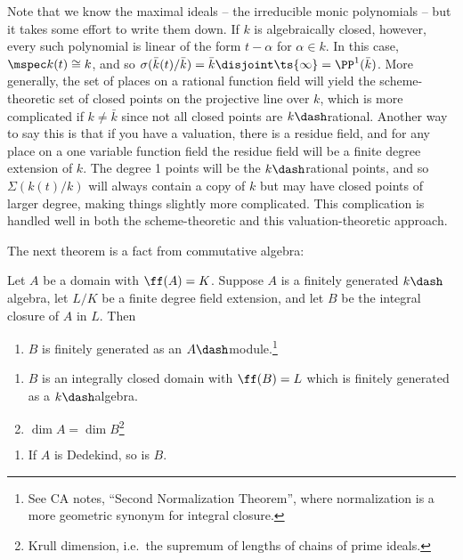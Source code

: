 Note that we know the maximal ideals -- the irreducible monic
polynomials -- but it takes some effort to write them down. If \(k\) is
algebraically closed, however, every such polynomial is linear of the
form \(t-\alpha\) for \(\alpha\in k\). In this case,
\(\mspec k(t) \cong k\), and so
\(\sigma( \bar k (t) / \bar k) = \bar k \disjoint \ts{\infty} = \PP^1(\bar k)\).
More generally, the set of places on a rational function field will
yield the scheme-theoretic set of closed points on the projective line
over \(k\), which is more complicated if \(k\neq \bar k\) since not all
closed points are \(k\dash\)rational. Another way to say this is that if
you have a valuation, there is a residue field, and for any place on a
one variable function field the residue field will be a finite degree
extension of \(k\). The degree 1 points will be the \(k\dash\)rational
points, and so \(\Sigma(k(t) / k)\) will always contain a copy of \(k\)
but may have closed points of larger degree, making things slightly more
complicated. This complication is handled well in both the
scheme-theoretic and this valuation-theoretic approach.

The next theorem is a fact from commutative algebra:

\begin{theorem}[?]

Let \(A\) be a domain with \(\ff(A) = K\). Suppose \(A\) is a finitely
generated \(k\dash\)algebra, let \(L/K\) be a finite degree field
extension, and let \(B\) be the integral closure of \(A\) in \(L\). Then

\begin{enumerate}
\def\labelenumi{\alph{enumi}.}
\tightlist
\item
  \(B\) is finitely generated as an \(A\dash\)module.\footnote{See CA
    notes, ``Second Normalization Theorem'', where normalization is a
    more geometric synonym for integral closure.}
\end{enumerate}

\begin{enumerate}
\def\labelenumi{\alph{enumi}.}
\setcounter{enumi}{1}
\item
  \(B\) is an integrally closed domain with \(\ff(B) = L\) which is
  finitely generated as a \(k\dash\)algebra.
\item
  \(\dim A = \dim B\)\footnote{Krull dimension, i.e.~the supremum of
    lengths of chains of prime ideals.}
\end{enumerate}

\begin{enumerate}
\def\labelenumi{\alph{enumi}.}
\setcounter{enumi}{3}
\tightlist
\item
  If \(A\) is Dedekind, so is \(B\).
\end{enumerate}

\end{theorem}

